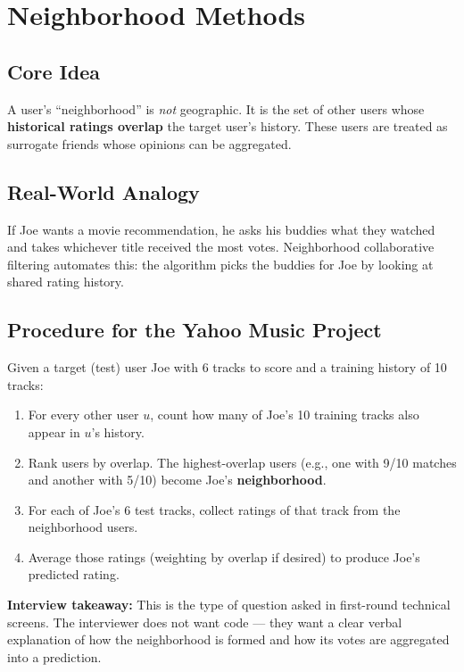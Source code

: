 \documentclass[11pt]{article}
\begin{document}
\section{Neighborhood Methods}
\label{sec:neighborhood}

\subsection{Core Idea}
A user's ``neighborhood'' is \emph{not} geographic. It is the set of other users whose \textbf{historical ratings overlap} the target user's history. These users are treated as surrogate friends whose opinions can be aggregated.

\subsection{Real-World Analogy}
If Joe wants a movie recommendation, he asks his buddies what they watched and takes whichever title received the most votes. Neighborhood collaborative filtering automates this: the algorithm picks the buddies for Joe by looking at shared rating history.

\subsection{Procedure for the Yahoo Music Project}
Given a target (test) user Joe with 6 tracks to score and a training history of 10 tracks:

\begin{enumerate}
    \item For every other user $u$, count how many of Joe's 10 training tracks also appear in $u$'s history.
    \item Rank users by overlap. The highest-overlap users (e.g., one with 9/10 matches and another with 5/10) become Joe's \textbf{neighborhood}.
    \item For each of Joe's 6 test tracks, collect ratings of that track from the neighborhood users.
    \item Average those ratings (weighting by overlap if desired) to produce Joe's predicted rating.
\end{enumerate}

\textbf{Interview takeaway:} This is the type of question asked in first-round technical screens. The interviewer does not want code --- they want a clear verbal explanation of how the neighborhood is formed and how its votes are aggregated into a prediction.
\end{document}
